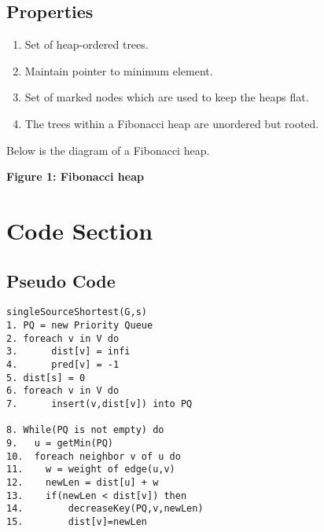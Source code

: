 \documentclass{article}
\begin{document}
\subsection{Properties}
\begin{enumerate}
\item Set of heap-ordered trees. 
\item Maintain pointer to minimum element.
\item Set of marked nodes which are used to keep the heaps flat.
\item The trees within a Fibonacci heap are unordered but rooted.
\end{enumerate}

Below is the diagram of a Fibonacci heap.

\newline
\textbf{Figure 1: Fibonacci heap}
\newline
\newline

\section{Code Section}
\subsection{Pseudo Code}
 \begin{verbatim}
singleSourceShortest(G,s)
1. PQ = new Priority Queue
2. foreach v in V do 
3. 		dist[v] = infi
4. 		pred[v] = -1
5. dist[s] = 0
6. foreach v in V do
7.		insert(v,dist[v]) into PQ

8. While(PQ is not empty) do
9.   u = getMin(PQ)
10.  foreach neighbor v of u do
11.    w = weight of edge(u,v)
12.    newLen = dist[u] + w
13.    if(newLen < dist[v]) then
14.        decreaseKey(PQ,v,newLen)
15.        dist[v]=newLen   
 
 \end{verbatim}
\end{document}
